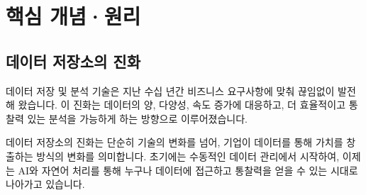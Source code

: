 \documentclass[11pt,a4paper]{article}
\begin{document}
\newpage
\section{핵심 개념·원리}

\subsection{데이터 저장소의 진화}
데이터 저장 및 분석 기술은 지난 수십 년간 비즈니스 요구사항에 맞춰 끊임없이 발전해 왔습니다. 이 진화는 데이터의 양, 다양성, 속도 증가에 대응하고, 더 효율적이고 통찰력 있는 분석을 가능하게 하는 방향으로 이루어졌습니다.

\begin{tcolorbox}[mybox={데이터 저장소 진화의 여정}]
데이터 저장소의 진화는 단순히 기술의 변화를 넘어, 기업이 데이터를 통해 가치를 창출하는 방식의 변화를 의미합니다. 초기에는 수동적인 데이터 관리에서 시작하여, 이제는 AI와 자연어 처리를 통해 누구나 데이터에 접근하고 통찰력을 얻을 수 있는 시대로 나아가고 있습니다.
\end{tcolorbox}
\end{document}
